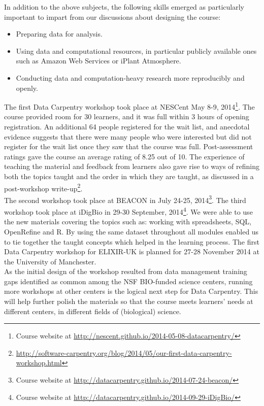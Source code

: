 \documentclass[15]{idcc}
\begin{document}
In addition to the above subjects, the following skills emerged as particularly important to impart from our discussions about designing the course:
\begin{itemize}
\item Preparing data for analysis.
\item Using data and computational resources, in particular publicly available ones such as Amazon Web Services or iPlant Atmosphere.
\item Conducting data and computation-heavy research more reproducibly and openly.
\end{itemize}

The first Data Carpentry workshop took place at NESCent May 8-9, 2014\footnote{Course website at \url{http://nescent.github.io/2014-05-08-datacarpentry/}}. The course provided room for 30 learners, and it was full within 3 hours of opening registration. An additional 64 people registered for the wait list, and anecdotal evidence suggests that there were many people who were interested but did not register for the wait list once they saw that the course was full. Post-assessment ratings gave the course an average rating of 8.25 out of 10. The experience of teaching the material and feedback from learners also gave rise to ways of refining both the topics taught and the order in which they are taught, as discussed in a post-workshop write-up\footnote{\url{http://software-carpentry.org/blog/2014/05/our-first-data-carpentry-workshop.html}}.\\

The second workshop took place at BEACON in July 24-25, 2014\footnote{Course website at \url{http://datacarpentry.github.io/2014-07-24-beacon/}}. The third workshop took place at iDigBio in 29-30 September, 2014\footnote{Course website at \url{http://datacarpentry.github.io/2014-09-29-iDigBio/}}. We were able to use the new materials covering the topics such as: working with spreadsheets, SQL, OpenRefine and R. By using the same dataset throughout all modules enabled us to tie together the taught concepts which helped in the learning process. The first Data Carpentry workshop for ELIXIR-UK is planned for 27-28 November 2014 at the University of Manchester. \\

As the initial design of the workshop resulted from data management training gaps identified as common among the  NSF BIO-funded science centers, running more workshops at other centers is the logical next step for Data Carpentry. This will help further polish the materials so that the course meets learners' needs at different centers, in different fields of (biological) science. 
\end{document}
